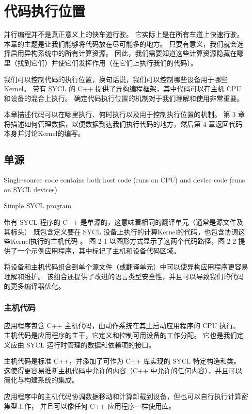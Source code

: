 \section{代码执行位置}
并行编程并不是真正意义上的快车道行驶。 它实际上是在所有车道上快速行驶。 本章的主题是让我们能够将代码放在尽可能多的地方。 
只要有意义，我们就会选择启用异构系统中的所有计算资源。 
因此，我们需要知道这些计算资源隐藏在哪里（找到它们）并使它们发挥作用（在它们上执行我们的代码）。

我们可以控制代码的执行位置，换句话说，我们可以控制哪些设备用于哪些Kernel。 
带有 SYCL 的 C++ 提供了异构编程框架，其中代码可以在主机 CPU 和设备的混合上执行。 
确定代码执行位置的机制对于我们理解和使用非常重要。

本章描述代码可以在哪里执行、何时执行以及用于控制执行位置的机制。 
第 3 章将描述如何管理数据，以便数据到达我们执行代码的地方，然后第 4 章返回代码本身并讨论Kernel的编写。


\subsection{单源}
{\color{red} Single-source code contains both host code (runs on CPU) and device code (runs on SYCL devices) }

{\color{red} Simple SYCL program }

带有 SYCL 程序的 C++ 是单源的，这意味着相同的翻译单元（通常是源文件及其标头）
既包含定义要在 SYCL 设备上执行的计算Kernel的代码，也包含协调这些Kernel执行的主机代码 。 
图 2-1 以图形方式显示了这两个代码路径，图 2-2 提供了一个示例应用程序，其中标记了主机和设备代码区域。

将设备和主机代码组合到单个源文件（或翻译单元）中可以使异构应用程序更容易理解和维护。 
该组合还提供了改进的语言类型安全性，并且可以导致我们的代码的更多编译器优化。

\subsubsection{主机代码}
应用程序包含 C++ 主机代码，由动作系统在其上启动应用程序的 CPU 执行。 
主机代码是应用程序的主干，它定义和控制可用设备的工作分配。 它也是我们定义应由 SYCL 运行时管理的数据和依赖项的接口。

主机代码是标准 C++，并添加了可作为 C++ 库实现的 SYCL 特定构造和类。 
这使得更容易推断主机代码中允许的内容（C++ 中允许的任何内容），并且可以简化与构建系统的集成。

应用程序中的主机代码协调数据移动和计算卸载到设备，但也可以自行执行计算密集型工作，
并且可以像任何 C++ 应用程序一样使用库。

